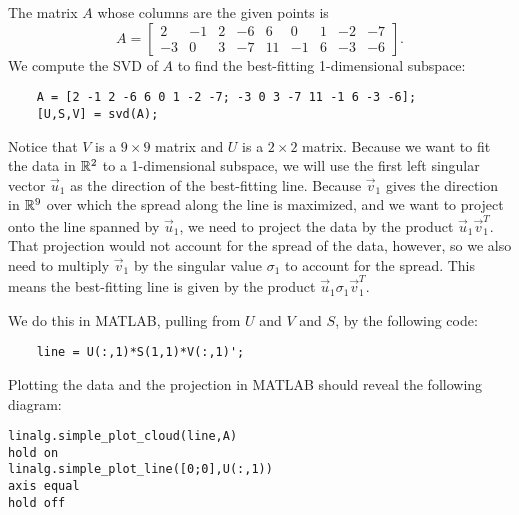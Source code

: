 \documentclass{ximera}
\begin{document}
\begin{problem}
  The matrix $A$ whose columns are the given points is
  \begin{equation*}
    A = \begin{bmatrix}
      2 & -1 & 2 & -6 & 6 & 0 & 1 & -2 & -7 \\
      -3 & 0 & 3 & -7 & 11 & -1 & 6 & -3 & -6
    \end{bmatrix}.
  \end{equation*}
  We compute the SVD of $A$ to find the best-fitting 1-dimensional subspace:

  \begin{verbatim}
    A = [2 -1 2 -6 6 0 1 -2 -7; -3 0 3 -7 11 -1 6 -3 -6];
    [U,S,V] = svd(A);
  \end{verbatim}

  Notice that $V$ is a $9\times 9$ matrix and $U$ is a $2\times 2$ matrix. Because we want to fit the data in $\mathbb{R}^2$ to a 1-dimensional subspace, we will use the first left singular vector $\vec{u}_1$ as the direction of the best-fitting line. Because $\vec{v}_1$ gives the direction in $\mathbb{R}^9$ over which the spread along the line is maximized, and we want to project onto the line spanned by $\vec{u}_1$, we need to project the data by the product $\vec{u}_1\vec{v}_1^T$. That projection would not account for the spread of the data, however, so we also need to multiply $\vec{v}_1$ by the singular value $\sigma_1$ to account for the spread. This means the best-fitting line is given by the product $\vec{u}_1\sigma_1\vec{v}_1^T$.

  We do this in MATLAB, pulling from $U$ and $V$ and $S$, by the following code:

  \begin{verbatim}
    line = U(:,1)*S(1,1)*V(:,1)';
  \end{verbatim}

  Plotting the data and the projection in MATLAB should reveal the following diagram:

  \begin{verbatim}
linalg.simple_plot_cloud(line,A)
hold on
linalg.simple_plot_line([0;0],U(:,1))
axis equal
hold off
  \end{verbatim}

  \begin{center}
  \end{center}


\end{problem}
\end{document}
